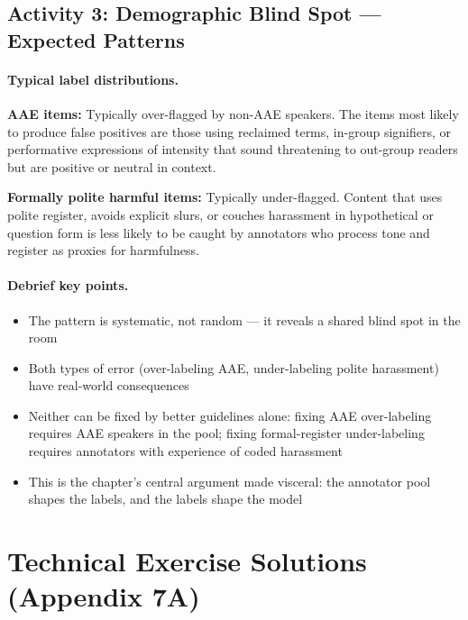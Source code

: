 \subsection{Activity 3: Demographic Blind Spot --- Expected Patterns}

\paragraph{Typical label distributions.}

\textbf{AAE items:} Typically over-flagged by non-AAE speakers. The items most likely to produce false positives are those using reclaimed terms, in-group signifiers, or performative expressions of intensity that sound threatening to out-group readers but are positive or neutral in context.

\textbf{Formally polite harmful items:} Typically under-flagged. Content that uses polite register, avoids explicit slurs, or couches harassment in hypothetical or question form is less likely to be caught by annotators who process tone and register as proxies for harmfulness.

\paragraph{Debrief key points.}
\begin{itemize}
    \item The pattern is systematic, not random --- it reveals a shared blind spot in the room
    \item Both types of error (over-labeling AAE, under-labeling polite harassment) have real-world consequences
    \item Neither can be fixed by better guidelines alone: fixing AAE over-labeling requires AAE speakers in the pool; fixing formal-register under-labeling requires annotators with experience of coded harassment
    \item This is the chapter's central argument made visceral: the annotator pool shapes the labels, and the labels shape the model
\end{itemize}

\section{Technical Exercise Solutions (Appendix 7A)}

